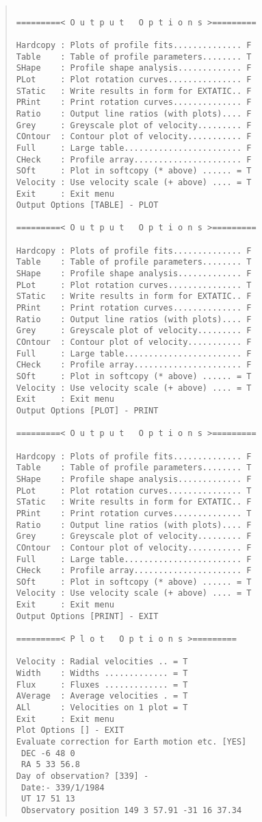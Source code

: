 \begin{quote}\begin{verbatim}

=========< O u t p u t   O p t i o n s >=========

Hardcopy : Plots of profile fits.............. F
Table    : Table of profile parameters........ T
SHape    : Profile shape analysis............. F
PLot     : Plot rotation curves............... F
STatic   : Write results in form for EXTATIC.. F
PRint    : Print rotation curves.............. F
Ratio    : Output line ratios (with plots).... F
Grey     : Greyscale plot of velocity......... F
COntour  : Contour plot of velocity........... F
Full     : Large table........................ F
CHeck    : Profile array...................... F
SOft     : Plot in softcopy (* above) ...... = T
Velocity : Use velocity scale (+ above) .... = T
Exit     : Exit menu
Output Options [TABLE] - PLOT

=========< O u t p u t   O p t i o n s >=========

Hardcopy : Plots of profile fits.............. F
Table    : Table of profile parameters........ T
SHape    : Profile shape analysis............. F
PLot     : Plot rotation curves............... T
STatic   : Write results in form for EXTATIC.. F
PRint    : Print rotation curves.............. F
Ratio    : Output line ratios (with plots).... F
Grey     : Greyscale plot of velocity......... F
COntour  : Contour plot of velocity........... F
Full     : Large table........................ F
CHeck    : Profile array...................... F
SOft     : Plot in softcopy (* above) ...... = T
Velocity : Use velocity scale (+ above) .... = T
Exit     : Exit menu
Output Options [PLOT] - PRINT

=========< O u t p u t   O p t i o n s >=========

Hardcopy : Plots of profile fits.............. F
Table    : Table of profile parameters........ T
SHape    : Profile shape analysis............. F
PLot     : Plot rotation curves............... T
STatic   : Write results in form for EXTATIC.. F
PRint    : Print rotation curves.............. T
Ratio    : Output line ratios (with plots).... F
Grey     : Greyscale plot of velocity......... F
COntour  : Contour plot of velocity........... F
Full     : Large table........................ F
CHeck    : Profile array...................... F
SOft     : Plot in softcopy (* above) ...... = T
Velocity : Use velocity scale (+ above) .... = T
Exit     : Exit menu
Output Options [PRINT] - EXIT

=========< P l o t   O p t i o n s >=========

Velocity : Radial velocities .. = T
Width    : Widths ............. = T
Flux     : Fluxes ............. = T
AVerage  : Average velocities . = T
ALl      : Velocities on 1 plot = T
Exit     : Exit menu
Plot Options [] - EXIT
Evaluate correction for Earth motion etc. [YES]
 DEC -6 48 0
 RA 5 33 56.8
Day of observation? [339] -
 Date:- 339/1/1984
 UT 17 51 13
 Observatory position 149 3 57.91 -31 16 37.34
\end{verbatim}\end{quote}

